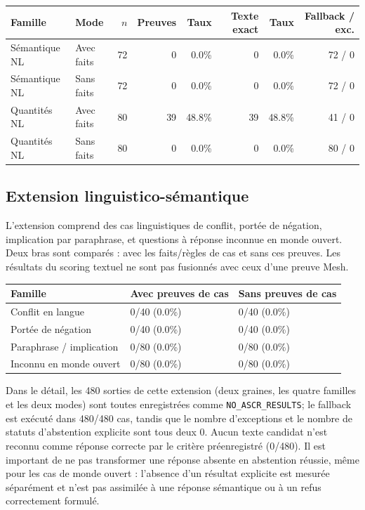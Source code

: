 \documentclass[11pt,a4paper]{article}
\begin{document}
\small\setlength{\tabcolsep}{2.5pt}
\begin{longtable}{p{}p{}rrrrrr}
\toprule Famille & Mode & $n$ & Preuves & Taux & Texte exact & Taux & Fallback / exc. \\
\midrule

Sémantique NL & Avec faits & 72 & 0 & 0.0\% & 0 & 0.0\% & 72 / 0 \\
Sémantique NL & Sans faits & 72 & 0 & 0.0\% & 0 & 0.0\% & 72 / 0 \\
Quantités NL & Avec faits & 80 & 39 & 48.8\% & 39 & 48.8\% & 41 / 0 \\
Quantités NL & Sans faits & 80 & 0 & 0.0\% & 0 & 0.0\% & 80 / 0 \\
\bottomrule
\end{longtable}
\normalsize\setlength{\tabcolsep}{6pt}

\subsection{Extension linguistico-sémantique}
L’extension comprend des cas linguistiques de conflit, portée de négation, implication par paraphrase, et questions à réponse inconnue en monde ouvert. Deux bras sont comparés : avec les faits/règles de cas et sans ces preuves. Les résultats du scoring textuel ne sont pas fusionnés avec ceux d’une preuve Mesh.
\small\setlength{\tabcolsep}{3pt}
\begin{longtable}{p{}p{}p{}}
\toprule Famille & Avec preuves de cas & Sans preuves de cas \\
\midrule

Conflit en langue & 0/40 (0.0\%) & 0/40 (0.0\%) \\
Portée de négation & 0/40 (0.0\%) & 0/40 (0.0\%) \\
Paraphrase / implication & 0/80 (0.0\%) & 0/80 (0.0\%) \\
Inconnu en monde ouvert & 0/80 (0.0\%) & 0/80 (0.0\%) \\
\bottomrule
\end{longtable}

Dans le détail, les 480 sorties de cette extension (deux graines, les quatre familles et les deux modes) sont toutes enregistrées comme \texttt{NO\_ASCR\_RESULTS}; le fallback est exécuté dans 480/480 cas, tandis que le nombre d’exceptions et le nombre de statuts d’abstention explicite sont tous deux 0. Aucun texte candidat n’est reconnu comme réponse correcte par le critère préenregistré (0/480). Il est important de ne pas transformer une réponse absente en abstention réussie, même pour les cas de monde ouvert : l’absence d’un résultat explicite est mesurée séparément et n’est pas assimilée à une réponse sémantique ou à un refus correctement formulé.
\end{document}
